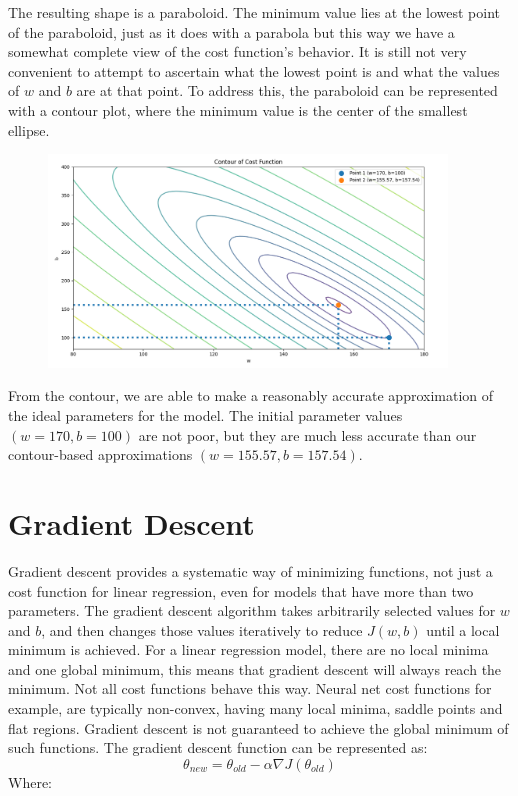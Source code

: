 \documentclass{article}
\begin{document}
\noindent The resulting shape is a paraboloid. The minimum value lies at the lowest point of the paraboloid, just as it does with a parabola but this way we have a somewhat complete view of the cost function's behavior. It is still not very convenient to attempt to ascertain what the lowest point is and what the values of $w$ and $b$ are at that point. To address this, the paraboloid can be represented with a contour plot, where the minimum value is the center of the smallest ellipse.

\begin{figure}[h!]
\centering
\includegraphics[width=300pt]{images/contour.png}
\end{figure}

\noindent From the contour, we are able to make a reasonably accurate approximation of the ideal parameters for the model. The initial parameter values $(w=170, b=100)$ are not poor, but they are much less accurate than our contour-based approximations $(w=155.57, b=157.54)$.

\section{Gradient Descent}
Gradient descent provides a systematic way of minimizing functions, not just a cost function for linear regression, even for models that have more than two parameters. The gradient descent algorithm takes arbitrarily selected values for $w$ and $b$, and then changes those values iteratively to reduce $J(w,b)$ until a local minimum is achieved. For a linear regression model, there are no local minima and one global minimum, this means that gradient descent will always reach the minimum. Not all cost functions behave this way. Neural net cost functions for example, are typically non-convex, having many local minima, saddle points and flat regions. Gradient descent is not guaranteed to achieve the global minimum of such functions. The gradient descent function can be represented as:
\[\theta_{new} = \theta_{old} - \alpha \nabla J(\theta_{old}) \]
\noindent Where:
\end{document}
